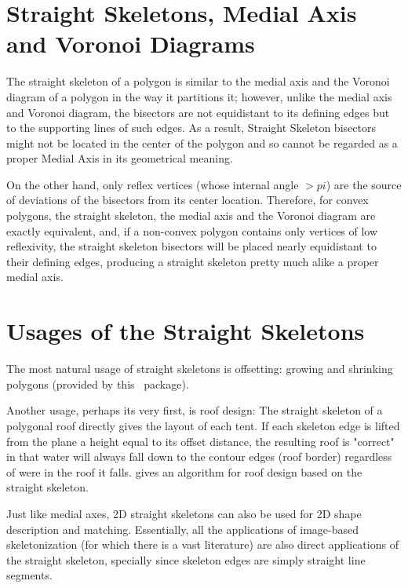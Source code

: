 \section{Straight Skeletons, Medial Axis and Voronoi Diagrams}  

The straight skeleton of a polygon is similar to the medial
axis and the Voronoi diagram of a polygon in the way it partitions
it; however, unlike the medial axis and Voronoi diagram, the
bisectors are not equidistant to its defining edges but to the
supporting lines of such edges. As a result, Straight Skeleton
bisectors might not be located in the center of the polygon and so
cannot be regarded as a proper Medial Axis in its geometrical meaning.

On the other hand, only reflex vertices (whose internal angle $>pi$)
are the source of deviations of the bisectors from its center
location. Therefore, for convex polygons, the straight skeleton, the
medial axis and the Voronoi diagram are exactly equivalent,
and, if a non-convex polygon contains only vertices of low
reflexivity, the straight skeleton bisectors will be placed nearly
equidistant to their defining edges, producing a straight skeleton
pretty much alike a proper medial axis.


\section{Usages of the Straight Skeletons}  

The most natural usage of straight skeletons is offsetting: growing and shrinking polygons (provided by this  \cgal\ package).

Another usage, perhaps its very first, is roof design: The straight skeleton of a polygonal roof directly gives the layout of each tent. If each skeleton edge is lifted from the plane a height equal to its offset distance, the resulting roof is "correct" in that water will always fall down to the contour edges (roof border) regardless of were in the roof it falls. \cite{cgal:ld-agrm-03} gives an algorithm for roof design based on the straight skeleton.

Just like medial axes, 2D straight skeletons can also be used for 2D shape description and matching. Essentially, all the applications of image-based skeletonization (for which there is a vast literature) are also direct applications of the straight skeleton, specially since skeleton edges are simply straight line segments.

